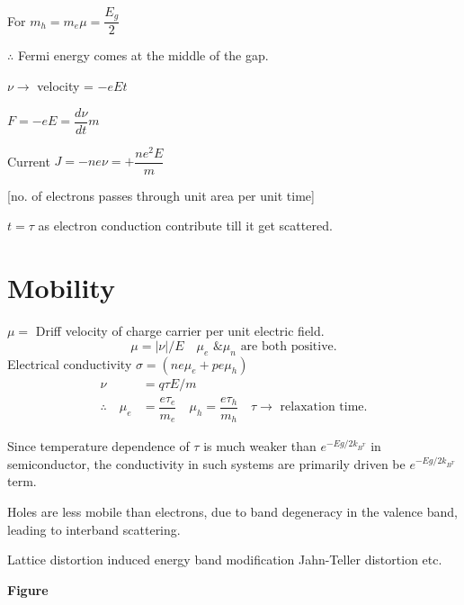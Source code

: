 For $m_{h}=m_{e}$\quad $\mu=\dfrac{E_{g}}{2}$

$\therefore$ Fermi energy comes at the middle of the gap.

$\nu\to$ velocity = $-eEt$

$F=-eE=\dfrac{d\nu}{dt}m$

Current $J=-ne\nu=+\dfrac{ne^{2}E}{m}$

[no. of electrons passes through unit area per unit time]

$t=\tau$ as electron conduction contribute till it get scattered.

\section*{Mobility}

$\mu=$ Driff velocity of charge carrier per unit electric field.
$$
\mu=|\nu|/E\quad \mu_{e} \text{ \& } \mu_{n}\text{ are both positive.}
$$
Electrical conductivity $\sigma=(ne\mu_{e}+pe\mu_{h})$
\begin{align*}
\nu &= q\tau E/m\\
\therefore\quad \mu_{e} &= \dfrac{e\tau_{e}}{m_{e}}\quad \mu_{h}=\dfrac{e\tau_{h}}{m_{h}}\quad \tau\to \text{ relaxation time.}
\end{align*}

Since temperature dependence of $\tau$ is much weaker than $e^{-Eg/2k_{B^{T}}}$ in semiconductor, the conductivity in such systems are primarily driven be $e^{-Eg/2k_{B^{T}}}$ term.

Holes are less mobile than electrons, due to band degeneracy in the valence band, leading to interband scattering.

Lattice distortion induced energy band modification Jahn-Teller distortion etc.
\begin{center}
{\bf Figure}
\end{center}




 
